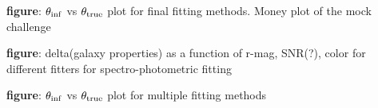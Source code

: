 


{\bf figure}: $\theta_{\rm inf}$ vs $\theta_{\rm true}$ plot for final fitting methods. Money plot of the mock challenge 

{\bf figure}: delta(galaxy properties) as a function of r-mag, SNR(?), color for different fitters for spectro-photometric fitting 

{\bf figure}: $\theta_{\rm inf}$ vs $\theta_{\rm true}$ plot for multiple fitting methods 

